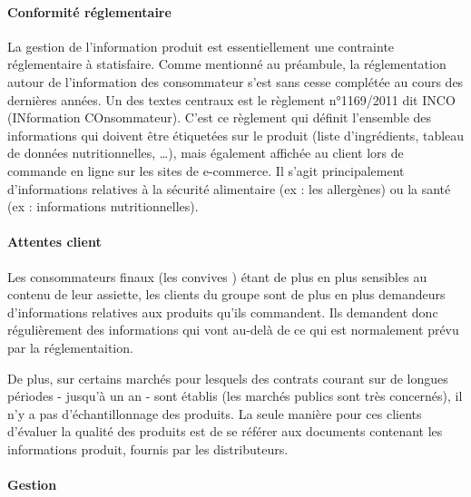                 \paragraph{Conformité réglementaire}
                La gestion de l'information produit est essentiellement une contrainte réglementaire à statisfaire.
                Comme mentionné au préambule, la réglementation autour de l'information des consommateur s'est sans cesse complétée au cours des dernières années.
                Un des textes centraux est le règlement n°1169/2011 dit INCO (INformation COnsommateur)\cite{incotext}\cite{incoexpl}.
                C'est ce règlement qui définit l'ensemble des informations qui doivent être étiquetées sur le produit (liste d'ingrédients, tableau de données nutritionnelles, \dots), mais également affichée au client lors de commande en ligne sur les sites de e-commerce.
                Il s'agit principalement d'informations relatives à la sécurité alimentaire (ex : les allergènes) ou la santé (ex : informations nutritionnelles).

                \paragraph{Attentes client}

                Les consommateurs finaux (les \og convives \fg) étant de plus en plus sensibles au contenu de leur assiette, les clients du groupe sont de plus en plus demandeurs d'informations relatives aux produits qu'ils commandent.
                Ils demandent donc régulièrement des informations qui vont au-delà de ce qui est normalement prévu par la réglementaition.

                De plus, sur certains marchés pour lesquels des contrats courant sur de longues périodes - jusqu'à un an - sont établis (les marchés publics sont très concernés), il n'y a pas d'échantillonnage des produits.
                La seule manière pour ces clients d'évaluer la qualité des produits est de se référer aux documents contenant les informations produit, fournis par les distributeurs.

                \paragraph{Gestion}


